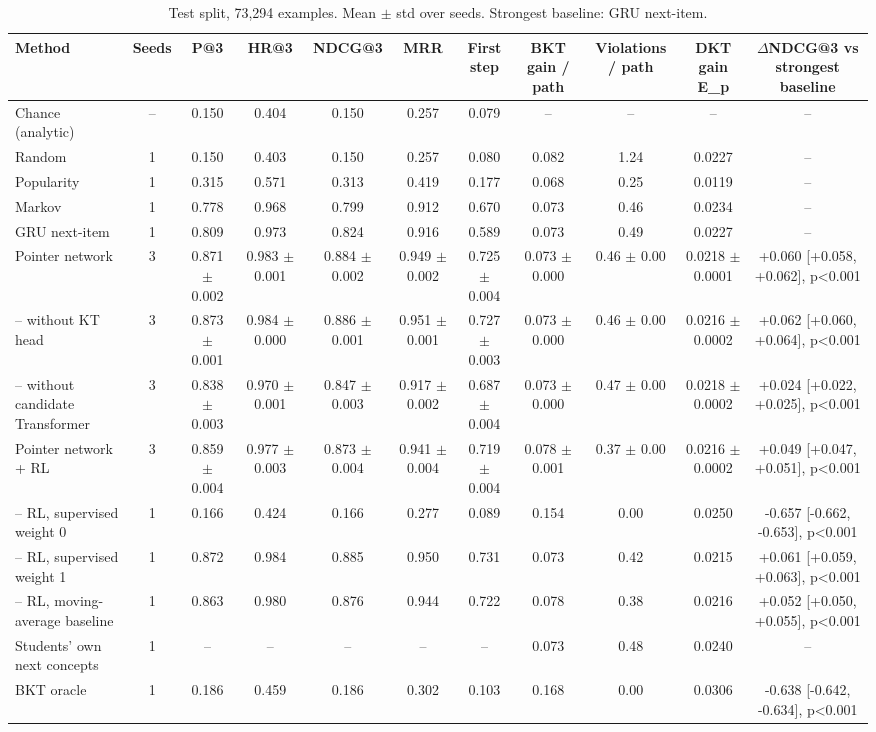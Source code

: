 \begin{table}[t]
\centering\small
\caption{Test split, 73,294 examples. Mean $\pm$ std over seeds. Strongest baseline: GRU next-item.}
\begin{tabular}{lcccccccccc}
\toprule
Method & Seeds & P@3 & HR@3 & NDCG@3 & MRR & First step & BKT gain / path & Violations / path & DKT gain E\_p & $\Delta$NDCG@3 vs strongest baseline \\
\midrule
Chance (analytic) & -- & 0.150 & 0.404 & 0.150 & 0.257 & 0.079 & -- & -- & -- & -- \\
Random & 1 & 0.150 & 0.403 & 0.150 & 0.257 & 0.080 & 0.082 & 1.24 & 0.0227 & -- \\
Popularity & 1 & 0.315 & 0.571 & 0.313 & 0.419 & 0.177 & 0.068 & 0.25 & 0.0119 & -- \\
Markov & 1 & 0.778 & 0.968 & 0.799 & 0.912 & 0.670 & 0.073 & 0.46 & 0.0234 & -- \\
GRU next-item & 1 & 0.809 & 0.973 & 0.824 & 0.916 & 0.589 & 0.073 & 0.49 & 0.0227 & -- \\
Pointer network & 3 & 0.871 $\pm$ 0.002 & 0.983 $\pm$ 0.001 & 0.884 $\pm$ 0.002 & 0.949 $\pm$ 0.002 & 0.725 $\pm$ 0.004 & 0.073 $\pm$ 0.000 & 0.46 $\pm$ 0.00 & 0.0218 $\pm$ 0.0001 & +0.060 [+0.058, +0.062], p<0.001 \\
-- without KT head & 3 & 0.873 $\pm$ 0.001 & 0.984 $\pm$ 0.000 & 0.886 $\pm$ 0.001 & 0.951 $\pm$ 0.001 & 0.727 $\pm$ 0.003 & 0.073 $\pm$ 0.000 & 0.46 $\pm$ 0.00 & 0.0216 $\pm$ 0.0002 & +0.062 [+0.060, +0.064], p<0.001 \\
-- without candidate Transformer & 3 & 0.838 $\pm$ 0.003 & 0.970 $\pm$ 0.001 & 0.847 $\pm$ 0.003 & 0.917 $\pm$ 0.002 & 0.687 $\pm$ 0.004 & 0.073 $\pm$ 0.000 & 0.47 $\pm$ 0.00 & 0.0218 $\pm$ 0.0002 & +0.024 [+0.022, +0.025], p<0.001 \\
Pointer network + RL & 3 & 0.859 $\pm$ 0.004 & 0.977 $\pm$ 0.003 & 0.873 $\pm$ 0.004 & 0.941 $\pm$ 0.004 & 0.719 $\pm$ 0.004 & 0.078 $\pm$ 0.001 & 0.37 $\pm$ 0.00 & 0.0216 $\pm$ 0.0002 & +0.049 [+0.047, +0.051], p<0.001 \\
-- RL, supervised weight 0 & 1 & 0.166 & 0.424 & 0.166 & 0.277 & 0.089 & 0.154 & 0.00 & 0.0250 & -0.657 [-0.662, -0.653], p<0.001 \\
-- RL, supervised weight 1 & 1 & 0.872 & 0.984 & 0.885 & 0.950 & 0.731 & 0.073 & 0.42 & 0.0215 & +0.061 [+0.059, +0.063], p<0.001 \\
-- RL, moving-average baseline & 1 & 0.863 & 0.980 & 0.876 & 0.944 & 0.722 & 0.078 & 0.38 & 0.0216 & +0.052 [+0.050, +0.055], p<0.001 \\
Students' own next concepts & 1 & -- & -- & -- & -- & -- & 0.073 & 0.48 & 0.0240 & -- \\
BKT oracle & 1 & 0.186 & 0.459 & 0.186 & 0.302 & 0.103 & 0.168 & 0.00 & 0.0306 & -0.638 [-0.642, -0.634], p<0.001 \\
\bottomrule
\end{tabular}
\end{table}
